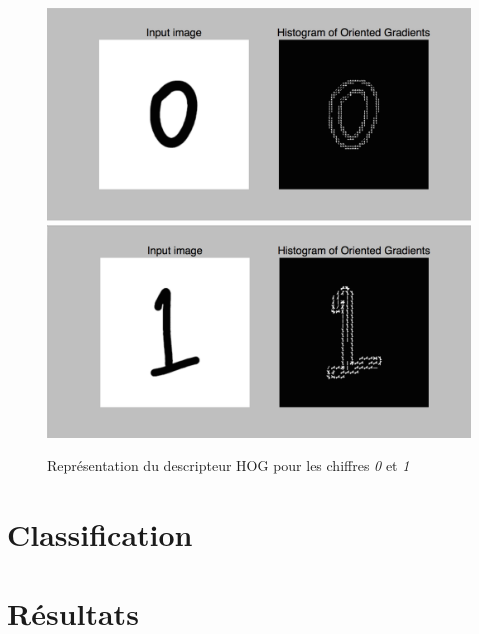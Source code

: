 \begin{figure}[!h]
\includegraphics[width=\textwidth]{pictures/hog0}
\includegraphics[width=\textwidth]{pictures/hog1}
\caption{Représentation du descripteur HOG pour les chiffres \emph{0} et \emph{1}}
\label{fig:hog}
\end{figure}

\section{Classification}

\section{Résultats}
